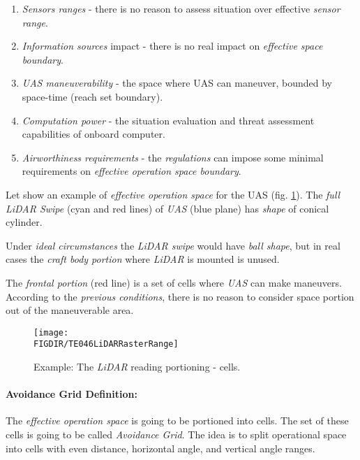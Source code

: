 \begin{enumerate}
        \item \emph{Sensors ranges} -  there is no reason to assess situation over effective \emph{sensor range}.
        
        \item \emph{Information sources} impact - there is no real impact on \emph{effective space boundary}.
        
        \item \emph{UAS maneuverability} - the space where UAS can maneuver, bounded by space-time (reach set boundary). 
        
        \item \emph{Computation power} - the situation evaluation and threat assessment capabilities of onboard computer.
        
        \item \emph{Airworthiness requirements} - the \emph{regulations} can impose some minimal requirements on \emph{effective operation space boundary}.
\end{enumerate}

Let show an example of \emph{effective operation space} for the UAS  (fig. \ref{fig:LidarSpaceSegmentation}).  The \emph{full LiDAR Swipe} (cyan and red lines) of \emph{UAS} (blue plane) has \emph{shape} of conical cylinder. 

\begin{note}
Under \emph{ideal circumstances} the \emph{LiDAR swipe} would have \emph{ball shape}, but in real cases the \emph{craft body portion} where \emph{LiDAR} is mounted is unused.
\end{note}

The \emph{frontal portion} (red line) is a set of cells where \emph{UAS} can make maneuvers. According to the \emph{previous conditions}, there is no reason to consider space portion out of the maneuverable area. 

\begin{figure}[H]
    \centering
    \texttt{[image: \\FIGDIR/TE046LiDARRasterRange]} 
    \caption{Example: The \emph{LiDAR} reading portioning - cells.}
    \label{fig:LidarSpaceSegmentation}
\end{figure}

\paragraph{Avoidance Grid Definition:} The \emph{effective operation space} is going to be portioned into cells. The set of these cells is going to be called \emph{Avoidance Grid}. The idea is to split operational space into cells with even distance, horizontal angle, and vertical angle ranges. 

